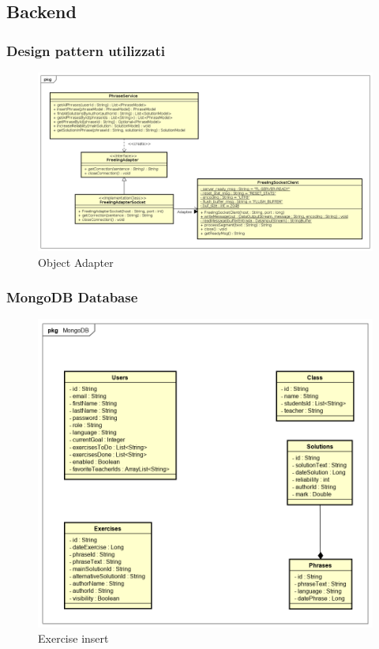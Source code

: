 \subsection{Backend}
\subsubsection{Design pattern utilizzati}
\begin{figure}[H]
\centering
\includegraphics[width=17cm, keepaspectratio]{img/Adapter.png} 
\caption{Object Adapter}
\end{figure}

\subsubsection{MongoDB Database}
\begin{figure}[H]
\centering
\includegraphics[width=17cm, keepaspectratio]{img/mongodb.png} 
\caption{Exercise insert}
\end{figure}

